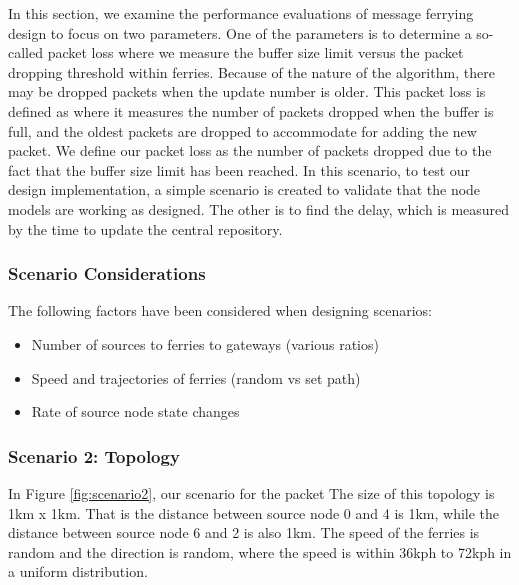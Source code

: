 In this section, we examine the performance evaluations of message ferrying design to focus on two parameters.  
One of the parameters is to determine a so-called packet loss where we measure the buffer size limit versus the packet dropping threshold within ferries.
Because of the nature of the algorithm, there may be dropped packets when the update number is older.
This packet loss is defined as where it measures the number of packets dropped when the buffer is full, and the oldest packets are dropped to accommodate for adding the new packet.  
We define our packet loss as the number of packets dropped due to the fact that the buffer size limit has been reached.
In this scenario, to test our design implementation, a simple scenario is created to validate that the node models are working as designed.  
The other is to find the delay, which is measured by the time to update the central repository.


\subsubsection{Scenario Considerations}

The following factors have been considered when designing scenarios:
\begin{itemize}
\item Number of sources to ferries to gateways (various ratios)
\item Speed and trajectories of ferries (random vs set path)
\item Rate of source node state changes
\end{itemize}

\subsubsection{Scenario 2: Topology}

In Figure \ref{fig:scenario2}, our scenario for the packet The size of this topology is 1km x 1km.  
That is the distance between source node 0 and 4 is 1km, while the distance between source node 6 and 2 is also 1km.  
The speed of the ferries is random and the direction is random, where the speed is within 36kph to 72kph in a uniform distribution.  

